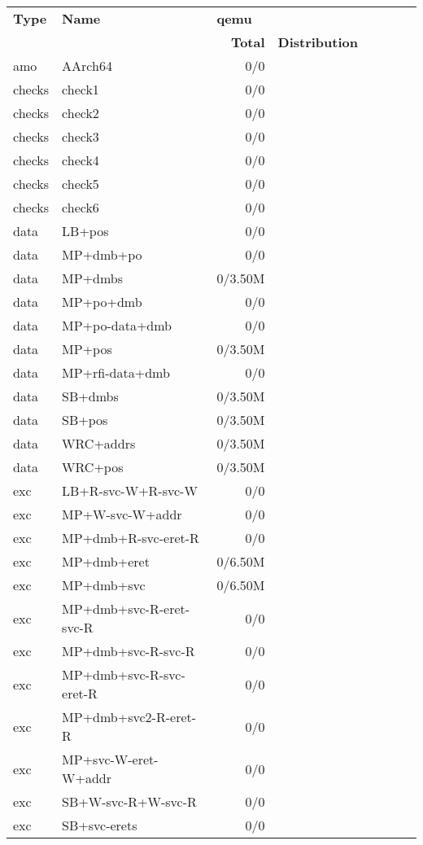 \begin{tabular}{l l  | r r l | r r l}
\textbf{Type} & \textbf{Name} & \multicolumn{3}{l}{\textbf{qemu}} \\
& & \textbf{Total} & \textbf{Distribution} &  \\
   amo&AArch64&0/0&&&\\
\hline
   checks&check1&0/0&&&\\
\hline
   checks&check2&0/0&&&\\
\hline
   checks&check3&0/0&&&\\
\hline
   checks&check4&0/0&&&\\
\hline
   checks&check5&0/0&&&\\
\hline
   checks&check6&0/0&&&\\
\hline
   data&LB+pos&0/0&&&\\
\hline
   data&MP+dmb+po&0/0&&&\\
\hline
   data&MP+dmbs&0/3.50M&&&\\
\hline
   data&MP+po+dmb&0/0&&&\\
\hline
   data&MP+po-data+dmb&0/0&&&\\
\hline
   data&MP+pos&0/3.50M&&&\\
\hline
   data&MP+rfi-data+dmb&0/0&&&\\
\hline
   data&SB+dmbs&0/3.50M&&&\\
\hline
   data&SB+pos&0/3.50M&&&\\
\hline
   data&WRC+addrs&0/3.50M&&&\\
\hline
   data&WRC+pos&0/3.50M&&&\\
\hline
   exc&LB+R-svc-W+R-svc-W&0/0&&&\\
\hline
   exc&MP+W-svc-W+addr&0/0&&&\\
\hline
   exc&MP+dmb+R-svc-eret-R&0/0&&&\\
\hline
   exc&MP+dmb+eret&0/6.50M&&&\\
\hline
   exc&MP+dmb+svc&0/6.50M&&&\\
\hline
   exc&MP+dmb+svc-R-eret-svc-R&0/0&&&\\
\hline
   exc&MP+dmb+svc-R-svc-R&0/0&&&\\
\hline
   exc&MP+dmb+svc-R-svc-eret-R&0/0&&&\\
\hline
   exc&MP+dmb+svc2-R-eret-R&0/0&&&\\
\hline
   exc&MP+svc-W-eret-W+addr&0/0&&&\\
\hline
   exc&SB+W-svc-R+W-svc-R&0/0&&&\\
\hline
   exc&SB+svc-erets&0/0&&&\\
\hline

\end{tabular}
